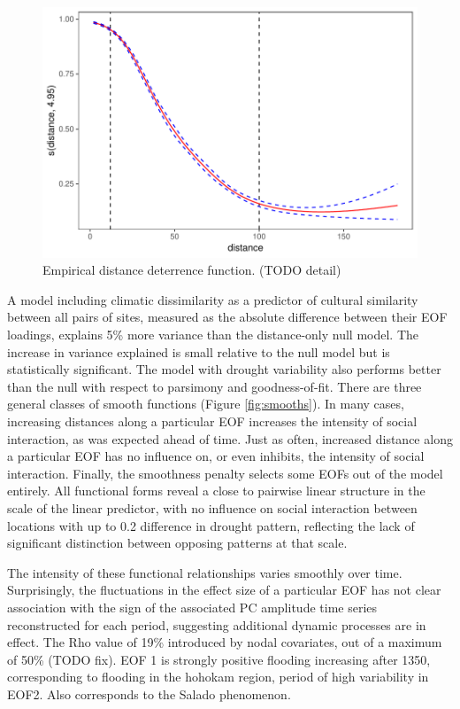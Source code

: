 \documentclass[10pt]{iopart}
\begin{document}
\begin{figure}[!htbp]
\centering
\includegraphics[width=\linewidth]{figures/distance_function.pdf}
\caption{Empirical distance deterrence function. (TODO detail)}
\label{fig:distance}
\end{figure}

A model including climatic dissimilarity as a predictor of cultural similarity between all pairs of sites, measured as the absolute difference between their EOF loadings, explains 5\% more variance than the distance-only null model. The increase in variance explained is small relative to the null model but is statistically significant. The model with drought variability also performs better than the null with respect to parsimony and goodness-of-fit. There are three general classes of smooth functions (Figure \ref{fig:smooths}). In many cases, increasing distances along a particular EOF increases the intensity of social interaction, as was expected ahead of time. Just as often, increased distance along a particular EOF has no influence on, or even inhibits, the intensity of social interaction. Finally, the smoothness penalty selects some EOFs out of the model entirely. All functional forms reveal a close to pairwise linear structure in the scale of the linear predictor, with no influence on social interaction between locations with up to 0.2 difference in drought pattern, reflecting the lack of significant distinction between opposing patterns at that scale. 

The intensity of these functional relationships varies smoothly over time. Surprisingly, the fluctuations in the effect size of a particular EOF has not clear association with the sign of the associated PC amplitude time series reconstructed for each period, suggesting additional dynamic processes are in effect. The Rho value of 19\% introduced by nodal covariates, out of a maximum of 50\% (TODO fix). EOF 1 is strongly positive flooding increasing after 1350, corresponding to flooding in the hohokam region, period of high variability in EOF2. Also corresponds to the Salado phenomenon.
\end{document}
